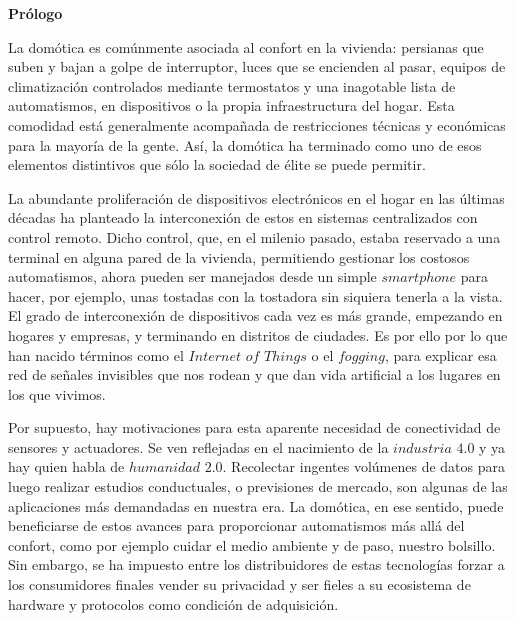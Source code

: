 
\newpage

\thispagestyle{empty}
\begin{center}

{\bf \Huge Prólogo}
\end{center}
\vspace{1cm}


La domótica es comúnmente asociada al confort en la vivienda: persianas que suben y bajan a golpe de interruptor, luces que se encienden al pasar, equipos de climatización controlados mediante termostatos y una inagotable lista de automatismos, en dispositivos o la propia infraestructura del hogar. Esta comodidad está generalmente acompañada de restricciones técnicas y económicas para la mayoría de la gente. Así, la domótica ha terminado como uno de esos elementos distintivos que sólo la sociedad de élite se puede permitir.

\vspace{0.5cm}

La abundante proliferación de dispositivos electrónicos en el hogar en las últimas décadas ha planteado la interconexión de estos en sistemas centralizados con control remoto. Dicho control, que, en el milenio pasado, estaba reservado a una terminal en alguna pared de la vivienda, permitiendo gestionar los costosos automatismos, ahora pueden ser manejados desde un simple $smartphone$ para hacer, por ejemplo, unas tostadas con la tostadora sin siquiera tenerla a la vista. El grado de interconexión de dispositivos cada vez es más grande, empezando en hogares y empresas, y terminando en distritos de ciudades. Es por ello por lo que han nacido términos como el $Internet$ $of$ $Things$ o el $fogging$, para explicar esa red de señales invisibles que nos rodean y que dan vida artificial a los lugares en los que vivimos.

\vspace{0.5cm}

Por supuesto, hay motivaciones para esta aparente necesidad de conectividad de sensores y actuadores. Se ven reflejadas en el nacimiento de la $industria$ $4{.}0$ y ya hay quien habla de $humanidad$ $2{.}0$. Recolectar ingentes volúmenes de datos para luego realizar estudios conductuales, o previsiones de mercado, son algunas de las aplicaciones más demandadas en nuestra era. La domótica, en ese sentido, puede beneficiarse de estos avances para proporcionar automatismos más allá del confort, como por ejemplo cuidar el medio ambiente y de paso, nuestro bolsillo. Sin embargo, se ha impuesto entre los distribuidores de estas tecnologías forzar a los consumidores finales vender su privacidad y ser fieles a su ecosistema de hardware y protocolos como condición de adquisición.

